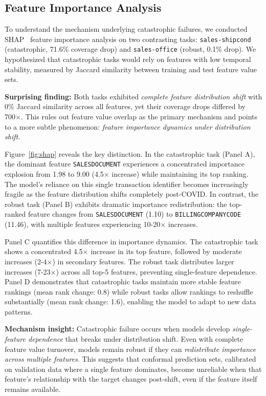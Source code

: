 
\subsection{Feature Importance Analysis}

To understand the mechanism underlying catastrophic failures, we conducted SHAP~\citep{lundberg2017unified} feature importance analysis on two contrasting tasks: \texttt{sales-shipcond} (catastrophic, 71.6\% coverage drop) and \texttt{sales-office} (robust, 0.1\% drop). We hypothesized that catastrophic tasks would rely on features with low temporal stability, measured by Jaccard similarity between training and test feature value sets.

\textbf{Surprising finding:} Both tasks exhibited \emph{complete feature distribution shift} with 0\% Jaccard similarity across all features, yet their coverage drops differed by 700×. This rules out feature value overlap as the primary mechanism and points to a more subtle phenomenon: \emph{feature importance dynamics under distribution shift}.

Figure~\ref{fig:shap} reveals the key distinction. In the catastrophic task (Panel A), the dominant feature \texttt{SALESDOCUMENT} experiences a concentrated importance explosion from 1.98 to 9.00 (4.5× increase) while maintaining its top ranking. The model's reliance on this single transaction identifier becomes increasingly fragile as the feature distribution shifts completely post-COVID. In contrast, the robust task (Panel B) exhibits dramatic importance redistribution: the top-ranked feature changes from \texttt{SALESDOCUMENT} (1.10) to \texttt{BILLINGCOMPANYCODE} (11.46), with multiple features experiencing 10-20× increases.

Panel C quantifies this difference in importance dynamics. The catastrophic task shows a concentrated 4.5× increase in its top feature, followed by moderate increases (2-4×) in secondary features. The robust task distributes larger increases (7-23×) across all top-5 features, preventing single-feature dependence. Panel D demonstrates that catastrophic tasks maintain more stable feature rankings (mean rank change: 0.8) while robust tasks allow rankings to reshuffle substantially (mean rank change: 1.6), enabling the model to adapt to new data patterns.

\textbf{Mechanism insight:} Catastrophic failure occurs when models develop \emph{single-feature dependence} that breaks under distribution shift. Even with complete feature value turnover, models remain robust if they can \emph{redistribute importance across multiple features}. This suggests that conformal prediction sets, calibrated on validation data where a single feature dominates, become unreliable when that feature's relationship with the target changes post-shift, even if the feature itself remains available.

